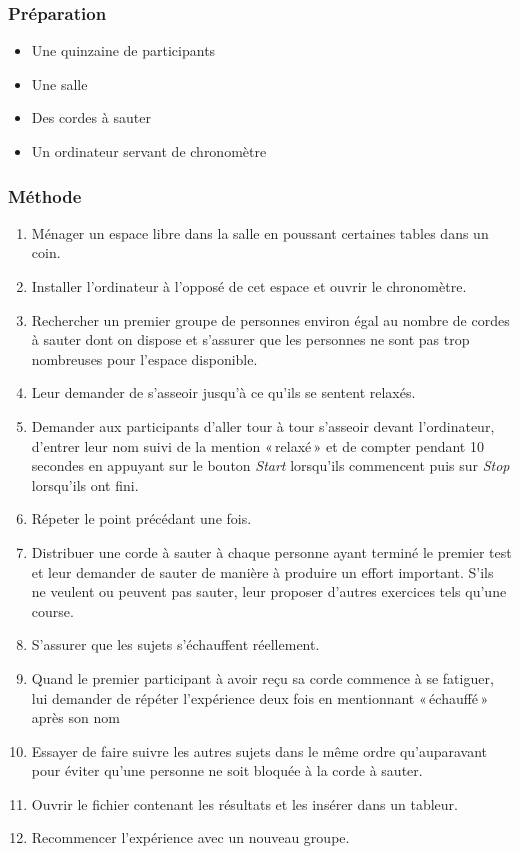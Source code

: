 \documentclass[12pt,fleqn,oneside,french,openany]{book} %
\begin{document}
\subsubsection{Préparation} \label{sssec:preparation2.2}
\begin{itemize}
	\item Une quinzaine de participants 
	\item Une salle
	\item Des cordes à sauter
	\item Un ordinateur servant de chronomètre
\end{itemize}

\subsubsection{Méthode} \label{sssec:methode2.2}
\begin{enumerate}
	\item Ménager un espace libre dans la salle en poussant certaines tables dans un coin.
	\item Installer l'ordinateur à l'opposé de cet espace et ouvrir le chronomètre.
	\item Rechercher un premier groupe de personnes environ égal au nombre de cordes à sauter dont on dispose et s'assurer que les personnes ne sont pas trop nombreuses pour l'espace disponible.
	\item Leur demander de s'asseoir jusqu'à ce qu'ils se sentent relaxés.
	\item Demander aux participants d'aller tour à tour s'asseoir devant l'ordinateur, d'entrer leur nom suivi de la mention «\,relaxé\,» et de compter pendant 10 secondes en appuyant sur le bouton \emph{Start} lorsqu'ils commencent puis sur \emph{Stop} lorsqu'ils ont fini.
	\item Répeter le point précédant une fois.
	\item Distribuer une corde à sauter à chaque personne ayant terminé le premier test et leur demander de sauter de manière à produire un effort important. S'ils ne veulent ou peuvent pas sauter, leur proposer d'autres exercices tels qu'une course.
	\item S'assurer que les sujets s'échauffent réellement.
	\item Quand le premier participant à avoir reçu sa corde commence à se fatiguer, lui demander de répéter l'expérience deux fois en mentionnant «\,échauffé\,» après son nom  \item Essayer de faire suivre les autres sujets dans le même ordre qu'auparavant pour éviter qu'une personne ne soit bloquée à la corde à sauter.
	\item Ouvrir le fichier contenant les résultats et les insérer dans un tableur.
	\item Recommencer l'expérience avec un nouveau groupe.
\end{enumerate}
\end{document}
